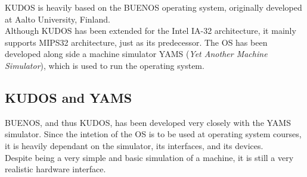 KUDOS is heavily based on the BUENOS operating system, originally developed at
Aalto University, Finland\cite{readthedocs:kudos}.\\
Although KUDOS has been extended for the Intel IA-32 architecture, it mainly supports
MIPS32 architecture, just as its predecessor. The OS has been developed along
side a machine simulator YAMS (\textit{Yet Another Machine Simulator}), which
is used to run the operating system.\cite{readthedocs:kudos}


\subsection{KUDOS and YAMS}
BUENOS, and thus KUDOS, has been developed very closely with the YAMS simulator.
Since the intetion of the OS is to be used at operating system courses, it is
heavily dependant on the simulator, its interfaces, and its devices.\\
Despite being a very simple and basic simulation of a machine, it is still a
very realistic hardware interface.


